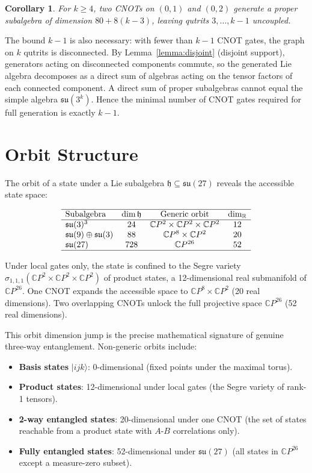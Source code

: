 \documentclass[12pt,a4paper]{article}
\newtheorem{corollary}[theorem]{Corollary}
\begin{document}
\begin{corollary}
\label{cor:minimal}
For $k \ge 4$, two CNOTs on $(0,1)$ and $(0,2)$ generate a proper
subalgebra of dimension $80 + 8(k-3)$, leaving qutrits $3,\dots,k-1$
uncoupled.
\end{corollary}

The bound $k-1$ is also necessary: with fewer than $k-1$ CNOT
gates, the graph on $k$ qutrits is disconnected. By Lemma~\ref{lemma:disjoint}
(disjoint support), generators acting on disconnected components commute,
so the generated Lie algebra decomposes as a direct sum of algebras
acting on the tensor factors of each connected component. A direct sum
of proper subalgebras cannot equal the simple algebra
$\mathfrak{su}(3^k)$. Hence the minimal number of CNOT gates required
for full generation is exactly $k-1$.

\section{Orbit Structure}

The orbit of a state under a Lie subalgebra $\mathfrak{h} \subseteq
\mathfrak{su}(27)$ reveals the accessible state space:

\[
\begin{array}{lccc}
\hline
\text{Subalgebra} & \dim \mathfrak{h} & \text{Generic orbit} & \dim_{\mathbb{R}} \\
\hline
\mathfrak{su}(3)^3 & 24 & \mathbb{C}P^2 \times \mathbb{C}P^2 \times \mathbb{C}P^2 & 12 \\
\mathfrak{su}(9) \oplus \mathfrak{su}(3) & 88 & \mathbb{C}P^8 \times \mathbb{C}P^2 & 20 \\
\mathfrak{su}(27) & 728 & \mathbb{C}P^{26} & 52 \\
\hline
\end{array}
\]

Under local gates only, the state is confined to the Segre variety
$\sigma_{1,1,1}(\mathbb{C}P^2 \times \mathbb{C}P^2 \times \mathbb{C}P^2)$
of product states, a 12-dimensional real submanifold of $\mathbb{C}P^{26}$.
One CNOT expands the accessible space to $\mathbb{C}P^8 \times \mathbb{C}P^2$
(20 real dimensions). Two overlapping CNOTs unlock the full projective
space $\mathbb{C}P^{26}$ (52 real dimensions).

This orbit dimension jump is the precise mathematical signature of
genuine three-way entanglement. Non-generic orbits include:
\begin{itemize}
\item \textbf{Basis states} $|ijk\rangle$: 0-dimensional (fixed points
under the maximal torus).
\item \textbf{Product states}: 12-dimensional under local gates (the Segre
variety of rank-1 tensors).
\item \textbf{2-way entangled states}: 20-dimensional under one CNOT
(the set of states reachable from a product state with $A$-$B$
correlations only).
\item \textbf{Fully entangled states}: 52-dimensional under $\mathfrak{su}(27)$
(all states in $\mathbb{C}P^{26}$ except a measure-zero subset).
\end{itemize}
\end{document}
